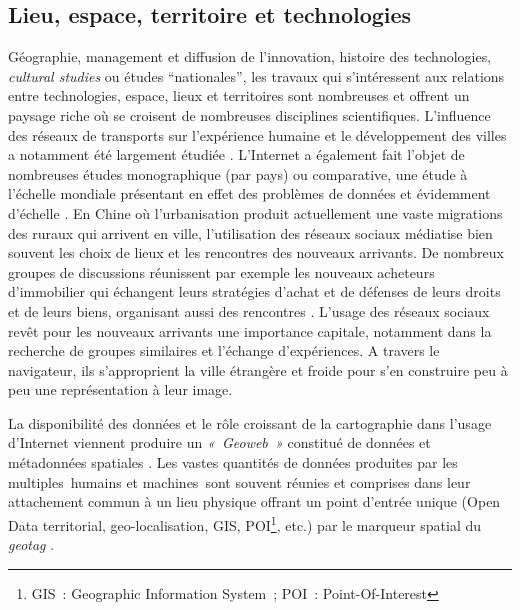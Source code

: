 \subsection[Lieu, espace, territoire et technologies]{Lieu, espace, territoire et technologies}
Géographie, management et diffusion de l’innovation, histoire des technologies, \textit{cultural studies} ou études “nationales”, les travaux qui s’intéressent aux relations entre technologies, espace, lieux et territoires sont nombreuses et offrent un paysage riche où se croisent de nombreuses disciplines scientifiques. L’influence des réseaux de transports sur l’expérience humaine et le développement des villes a notamment été largement étudiée \citep{Offner1993,Doulet2001}. L’Internet a également fait l’objet de nombreuses études monographique (par pays) ou comparative, une étude à l’échelle mondiale présentant en effet des problèmes de données et évidemment d’échelle \citep{Dupuy2004}. En Chine où l'urbanisation produit actuellement une vaste migrations des ruraux qui arrivent en ville, l'utilisation des réseaux sociaux médiatise bien souvent les choix de lieux et les rencontres des nouveaux arrivants. De nombreux groupes de discussions réunissent par exemple les nouveaux acheteurs d’immobilier qui échangent leurs stratégies d’achat et de défenses de leurs droits et de leurs biens, organisant aussi des rencontres \citep{Li2013}. L’usage des réseaux sociaux revêt pour les nouveaux arrivants une importance capitale, notamment dans la recherche de groupes similaires et l’échange d’expériences. A travers le navigateur, ils s'approprient la ville étrangère et froide pour s'en construire peu à peu une représentation à leur image.

La disponibilité des données et le rôle croissant de la cartographie dans l’usage d’Internet viennent produire un \textit{« Geoweb »} constitué de données et métadonnées spatiales \citep{Crampton2009}. Les vastes quantités de données produites par les multiples humains et machines sont souvent réunies et comprises dans leur attachement commun à un lieu physique \citep{Torrens2010} offrant un point d'entrée unique (Open Data territorial, geo-localisation, GIS, POI\footnote{GIS : Geographic Information System ; POI : Point-Of-Interest}, etc.) par le marqueur spatial du \textit{geotag} \citep{Crampton2013}.

